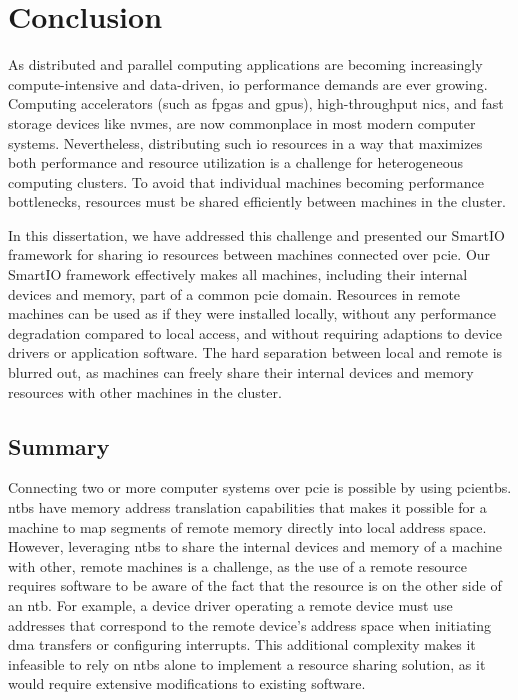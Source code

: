 \chapter{Conclusion}\label{chapter:conclusion}
As distributed and parallel computing applications are becoming increasingly compute-intensive and data-driven, \gls{io} performance demands are ever growing.
%
Computing accelerators (such as \glspl{fpga} and \glspl{gpu}), high-throughput \glspl{nic}, and fast storage devices like \glspl{nvme}, are now commonplace in most modern computer systems.
%
Nevertheless, distributing such \gls{io} resources in a way that maximizes both performance and resource utilization is a challenge for heterogeneous computing clusters. 
%
To avoid that individual machines becoming performance bottlenecks, resources must be shared efficiently between machines in the cluster.



In this dissertation, we have addressed this challenge and presented our SmartIO framework for sharing \gls{io} resources between machines connected over \gls{pcie}.
%
Our SmartIO framework effectively makes all machines, including their internal devices and memory, part of a common \gls{pcie} domain.
%
Resources in remote machines can be used as if they were installed locally, without any performance degradation compared to local access, and without requiring adaptions to device drivers or application software.
%
The hard separation between local and remote is blurred out, as machines can freely share their internal devices and memory resources with other machines in the cluster. 



\section{Summary}\label{sec:summary}
Connecting two or more computer systems over \gls{pcie} is possible by using \glspl{pcientb}.
%
\Glspl{ntb} have memory address translation capabilities that makes it possible for a machine to map \glspl{segment} of remote memory directly into local address space.
%
However, leveraging \glspl{ntb} to share the internal devices and memory of a machine with other, remote machines is a challenge, as the use of a remote resource requires software to be aware of the fact that the resource is on the other side of an \gls{ntb}.
%
For example, a device driver operating a remote device must use addresses that correspond to the remote device's address space when initiating \gls{dma} transfers or configuring interrupts.
%
This additional complexity makes it infeasible to rely on \glspl{ntb} alone to implement a resource sharing solution, as it would require extensive modifications to existing software.



